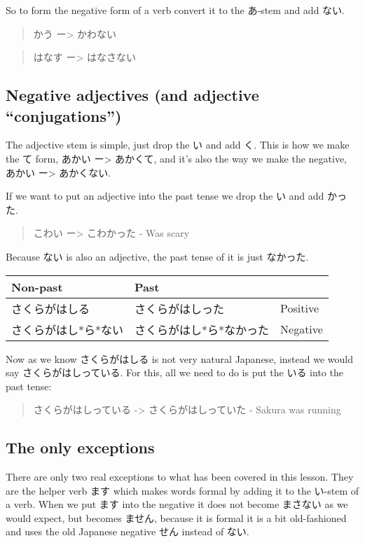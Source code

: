\documentclass[11pt]{article}
\begin{document}
So to form the negative form of a verb convert it to the あ-stem and add ない.
\begin{quote}
かう ー> かわない
\end{quote}
\begin{quote}
はなす ー> はなさない
\end{quote}

\subsection{Negative adjectives (and adjective ``conjugations'')}
\label{sec:orgaf99422}
The adjective stem is simple, just drop the い and add く. This is how we make the て form, あかい ー> あかくて, and it's also the way we make the negative, あかい ー> あかくない.

If we want to put an adjective into the past tense we drop the い and add かった.
\begin{quote}
こわい ー> こわかった - Was scary
\end{quote}

Because ない is also an adjective, the past tense of it is just なかった.

\begin{center}
\begin{tabular}{lll}
Non-past & Past & \\
\hline
さくらがはしる & さくらがはしった & Positive\\
さくらがはし*ら*ない & さくらがはし*ら*なかった & Negative\\
\end{tabular}
\end{center}

Now as we know さくらがはしる is not very natural Japanese, instead we would say さくらがはしっている. For this, all we need to do is put the いる into the past tense:
\begin{quote}
さくらがはしっている -> さくらがはしっていた - Sakura was running
\end{quote}

\subsection{The only exceptions}
\label{sec:org885797e}
There are only two real exceptions to what has been covered in this lesson. They are the helper verb ます which makes words formal by adding it to the い-stem of a verb. When we put ます into the negative it does not become まさない as we would expect, but becomes ません, because it is formal it is a bit old-fashioned and uses the old Japanese negative せん instead of ない.
\end{document}
